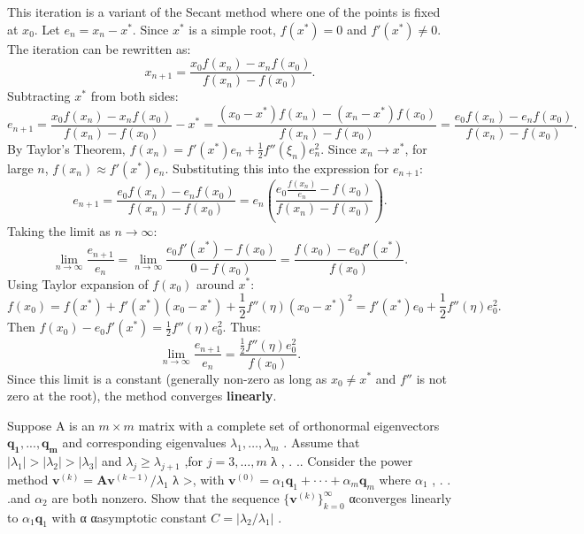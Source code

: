 \begin{solution}
This iteration is a variant of the Secant method where one of the points is fixed at $x_0$. Let $e_n = x_n - x^*$. Since $x^*$ is a simple root, $f(x^*) = 0$ and $f'(x^*) \neq 0$.
The iteration can be rewritten as:
\[
x_{n+1} = \frac{x_0 f(x_n) - x_n f(x_0)}{f(x_n) - f(x_0)}.
\]
Subtracting $x^*$ from both sides:
\[
e_{n+1} = \frac{x_0 f(x_n) - x_n f(x_0)}{f(x_n) - f(x_0)} - x^* = \frac{(x_0 - x^*) f(x_n) - (x_n - x^*) f(x_0)}{f(x_n) - f(x_0)} = \frac{e_0 f(x_n) - e_n f(x_0)}{f(x_n) - f(x_0)}.
\]
By Taylor's Theorem, $f(x_n) = f'(x^*) e_n + \frac{1}{2} f''(\xi_n) e_n^2$. Since $x_n \to x^*$, for large $n$, $f(x_n) \approx f'(x^*) e_n$.
Substituting this into the expression for $e_{n+1}$:
\[
e_{n+1} = \frac{e_0 f(x_n) - e_n f(x_0)}{f(x_n) - f(x_0)} = e_n \left( \frac{e_0 \frac{f(x_n)}{e_n} - f(x_0)}{f(x_n) - f(x_0)} \right).
\]
Taking the limit as $n \to \infty$:
\[
\lim_{n \to \infty} \frac{e_{n+1}}{e_n} = \lim_{n \to \infty} \frac{e_0 f'(x^*) - f(x_0)}{0 - f(x_0)} = \frac{f(x_0) - e_0 f'(x^*)}{f(x_0)}.
\]
Using Taylor expansion of $f(x_0)$ around $x^*$:
\[
f(x_0) = f(x^*) + f'(x^*) (x_0 - x^*) + \frac{1}{2} f''(\eta) (x_0 - x^*)^2 = f'(x^*) e_0 + \frac{1}{2} f''(\eta) e_0^2.
\]
Then $f(x_0) - e_0 f'(x^*) = \frac{1}{2} f''(\eta) e_0^2$. Thus:
\[
\lim_{n \to \infty} \frac{e_{n+1}}{e_n} = \frac{\frac{1}{2} f''(\eta) e_0^2}{f(x_0)}.
\]
Since this limit is a constant (generally non-zero as long as $x_0 \neq x^*$ and $f''$ is not zero at the root), the method converges \textbf{linearly}.
\end{solution}

\begin{exercise}
\label{applied:2020:3}
Suppose A is an $m \times m$ matrix with a complete set of orthonormal eigenvectors $\mathbf { q _ { 1 } , . . . , q _ { m } }$ and corresponding eigenvalues $\lambda _ { 1 } , \ldots , \lambda _ { m }$ . Assume that $\left| \lambda _ { 1 } \right| > \left| \lambda _ { 2 } \right| > \left| \lambda _ { 3 } \right|$ and $\lambda _ { j } \geq \lambda _ { j + 1 }$ ,for $j = 3 , \ldots , m$ λ , . .. Consider the power method $\mathbf { v } ^ { ( k ) } = \mathbf { A } \mathbf { v } ^ { ( k - 1 ) } / \lambda _ { 1 }$ λ >, with $\mathbf { v } ^ { ( 0 ) } = \alpha _ { 1 } \mathbf { q } _ { 1 } + \cdot \cdot \cdot + \alpha _ { m } \mathbf { q } _ { m }$ where $\alpha _ { 1 }$ , . . .and $\alpha _ { 2 }$ are both nonzero. Show that the sequence $\{ \mathbf { v } ^ { ( k ) } \} _ { k = 0 } ^ { \infty }$ αconverges linearly to $\alpha _ { 1 } \mathbf { q } _ { 1 }$ with α αasymptotic constant $C = | \lambda _ { 2 } / \lambda _ { 1 } |$ .
\end{exercise}

